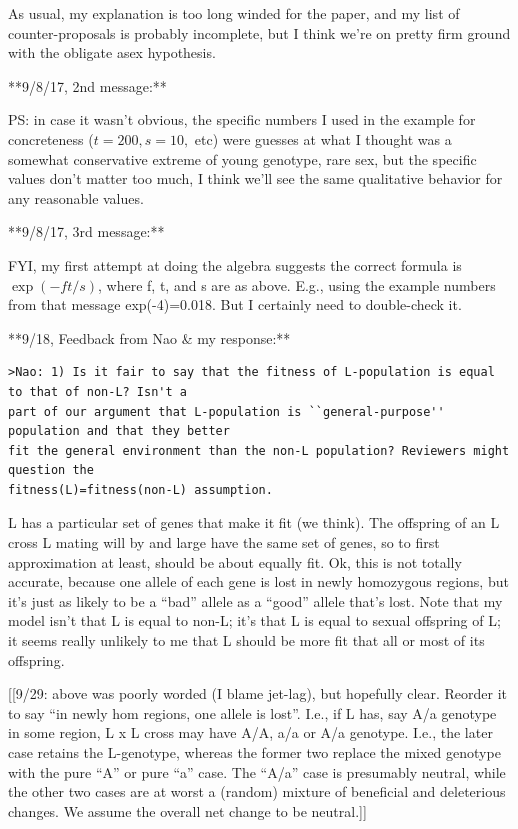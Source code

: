 \documentclass{article}\usepackage[]{graphicx}\usepackage[]{color}
\begin{document}
As usual, my explanation is too long winded for the paper, and my list of counter-proposals is
probably incomplete, but I think we’re on pretty firm ground with the obligate asex hypothesis.

**9/8/17, 2nd message:**

PS: in case it wasn’t obvious, the specific numbers I used in the example for concreteness
($t=200, s=10,$ etc) were guesses at what I thought was a somewhat conservative extreme of young
genotype, rare sex, but the specific values don’t matter too much, I think we’ll see the same
qualitative behavior for any reasonable values.

**9/8/17, 3rd message:**

FYI, my first attempt at doing the algebra suggests the correct formula is $\exp(-ft/s)$, where f,
t, and s are as above.  E.g., using the example numbers from that message exp(-4)=0.018.  But I
certainly need to double-check it.

**9/18, Feedback from Nao \& my response:**


\begin{verbatim}
>Nao: 1) Is it fair to say that the fitness of L-population is equal to that of non-L? Isn't a 
part of our argument that L-population is ``general-purpose'' population and that they better 
fit the general environment than the non-L population? Reviewers might question the 
fitness(L)=fitness(non-L) assumption. 
\end{verbatim}

L has a particular set of genes that make it fit (we think).  The offspring of an L cross L mating
will by and large have the same set of genes, so to first approximation at least, should be about
equally fit.  Ok, this is not totally accurate, because one allele of each gene is lost in newly
homozygous regions, but it’s just as likely to be a “bad” allele as a “good” allele that’s lost.
Note that my model isn’t that L is equal to non-L; it’s that L is equal to sexual offspring of L; it
seems really unlikely to me that L should be more fit that all or most of its offspring.

[[9/29: above was poorly worded (I blame jet-lag), but hopefully clear.  Reorder it to say ``in
newly hom regions, one allele is lost''.  I.e., if L has, say A/a genotype in some region, L x L
cross may have A/A, a/a or A/a genotype.  I.e., the later case retains the L-genotype, whereas the
former two replace the mixed genotype with the pure ``A'' or pure ``a'' case.  The ``A/a'' case is
presumably neutral, while the other two cases are at worst a (random) mixture of beneficial and
deleterious changes.  We assume the overall net change to be neutral.]]
\end{document}
